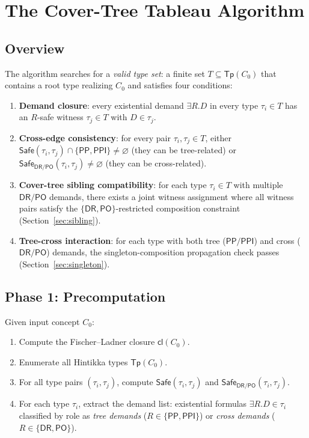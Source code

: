 \documentclass[a4paper,11pt]{article}
\theoremstyle{definition}
\newcommand{\DR}{\ensuremath{\mathsf{DR}}}
\newcommand{\PO}{\ensuremath{\mathsf{PO}}}
\newcommand{\PP}{\ensuremath{\mathsf{PP}}}
\newcommand{\PPI}{\ensuremath{\mathsf{PPI}}}
\newcommand{\cl}{\ensuremath{\mathsf{cl}}}
\newcommand{\Tp}{\ensuremath{\mathsf{Tp}}}
\newcommand{\Safe}{\ensuremath{\mathsf{Safe}}}
\begin{document}
\section{The Cover-Tree Tableau Algorithm}
\label{sec:algorithm}

\subsection{Overview}

The algorithm searches for a \emph{valid type set}: a finite set
$T \subseteq \Tp(C_0)$ that contains a root type realizing $C_0$
and satisfies four conditions:
\begin{enumerate}[label=(CT\arabic*)]
  \item \textbf{Demand closure}: every existential demand
    $\exists R.D$ in every type $\tau_i \in T$ has an $R$-safe
    witness $\tau_j \in T$ with $D \in \tau_j$.
  \item \textbf{Cross-edge consistency}: for every pair
    $\tau_i, \tau_j \in T$, either
    $\Safe(\tau_i,\tau_j) \cap \{\PP,\PPI\} \neq \varnothing$
    (they can be tree-related) or
    $\Safe_{\DR/\PO}(\tau_i,\tau_j) \neq \varnothing$
    (they can be cross-related).
  \item \textbf{Cover-tree sibling compatibility}: for each type
    $\tau_i \in T$ with multiple $\DR/\PO$ demands, there exists
    a joint witness assignment where all witness pairs satisfy the
    $\{\DR,\PO\}$-restricted composition constraint
    (Section~\ref{sec:sibling}).
  \item \textbf{Tree-cross interaction}: for each type with both
    tree ($\PP/\PPI$) and cross ($\DR/\PO$) demands, the
    singleton-composition propagation check passes
    (Section~\ref{sec:singleton}).
\end{enumerate}

\subsection{Phase 1: Precomputation}

Given input concept $C_0$:
\begin{enumerate}[nosep]
  \item Compute the Fischer--Ladner closure $\cl(C_0)$.
  \item Enumerate all Hintikka types $\Tp(C_0)$.
  \item For all type pairs $(\tau_i, \tau_j)$, compute
    $\Safe(\tau_i, \tau_j)$ and
    $\Safe_{\DR/\PO}(\tau_i, \tau_j)$.
  \item For each type $\tau_i$, extract the demand list:
    existential formulas $\exists R.D \in \tau_i$ classified by
    role as \emph{tree demands} ($R \in \{\PP, \PPI\}$) or
    \emph{cross demands} ($R \in \{\DR, \PO\}$).
\end{enumerate}
\end{document}
